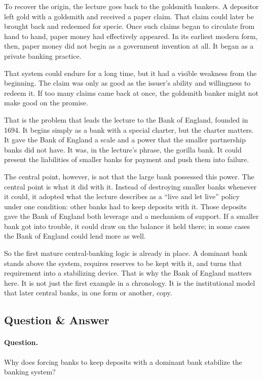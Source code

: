 To recover the origin, the lecture goes back to the goldsmith bankers. A depositor left gold with a goldsmith and received a paper claim. That claim could later be brought back and redeemed for specie. Once such claims began to circulate from hand to hand, paper money had effectively appeared. In its earliest modern form, then, paper money did not begin as a government invention at all. It began as a private banking practice.

That system could endure for a long time, but it had a visible weakness from the beginning. The claim was only as good as the issuer's ability and willingness to redeem it. If too many claims came back at once, the goldsmith banker might not make good on the promise.

That is the problem that leads the lecture to the Bank of England, founded in 1694. It begins simply as a bank with a special charter, but the charter matters. It gave the Bank of England a scale and a power that the smaller partnership banks did not have. It was, in the lecture's phrase, the gorilla bank. It could present the liabilities of smaller banks for payment and push them into failure.

The central point, however, is not that the large bank possessed this power. The central point is what it did with it. Instead of destroying smaller banks whenever it could, it adopted what the lecture describes as a ``live and let live'' policy under one condition: other banks had to keep deposits with it. Those deposits gave the Bank of England both leverage and a mechanism of support. If a smaller bank got into trouble, it could draw on the balance it held there; in some cases the Bank of England could lend more as well.

So the first mature central-banking logic is already in place. A dominant bank stands above the system, requires reserves to be kept with it, and turns that requirement into a stabilizing device. That is why the Bank of England matters here. It is not just the first example in a chronology. It is the institutional model that later central banks, in one form or another, copy.

\subsection{Question \& Answer}

\paragraph{Question.} Why does forcing banks to keep deposits with a dominant bank stabilize the banking system?

